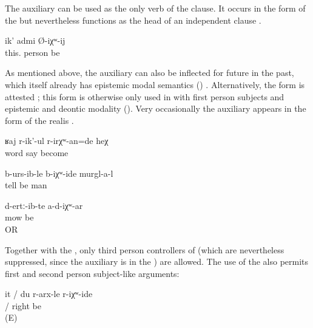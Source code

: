 The auxiliary can be used as the only verb of the clause. It occurs in the form of the  but nevertheless functions as the head of an independent clause .
%
\begin{exe}
	\ex	\label{ex:This is probably a man.}
	\gll	ik'	admi	Ø-iχʷ-ij\\
		this.	person	be\\
	\glt	{}
\end{exe}

As mentioned above, the auxiliary can also be inflected for future in the past, which itself already has epistemic modal semantics () . Alternatively, the  form is attested ; this form is otherwise only used in  with first person subjects and epistemic and deontic modality (). Very occasionally the auxiliary appears in the form of the realis  .
%
\begin{exe}
	\ex	\label{ex:‎She must have been scolding / probably she was scolding}
	\gll	ʁaj	r-ik'-ul	r-irχʷ-an=de	heχ\\
		word	say	become	\\
	\glt	{}

	\ex	\label{ex:‎Probably the men had already told it}
	\gll	b-urs-ib-le	b-iχʷ-ide	murgl-a-l\\
		tell	be	man	\\
	\glt	{}

	\ex	\label{ex:‎‎This is probably mowed (grass).}
	\gll	d-ertː-ib-te	a-d-iχʷ-ar\\
		mow 	be\\
	\glt	{} OR 
\end{exe}

Together with the , only third person controllers of  (which are nevertheless suppressed, since the auxiliary is in the ) are allowed. The use of the  also permits first and second person subject-like arguments:
%
\begin{exe}
	\ex	\label{ex:She / I was probably right}
	\gll	it	/	du	r-arx-le	r-iχʷ-ide\\
			/		right	be\\
	\glt	{} (E)
\end{exe}


